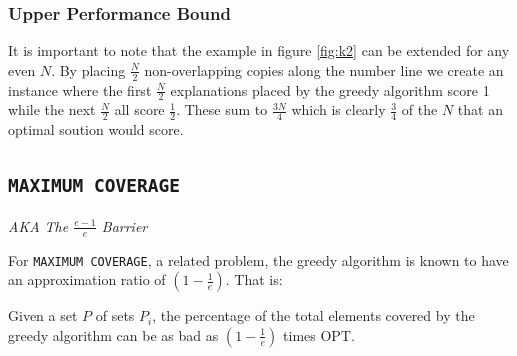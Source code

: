 \subsubsection{Upper Performance Bound}

It is important to note that the example in figure \ref{fig:k2} can be extended for any even $N$. By placing $\frac{N}{2}$ non-overlapping copies along the number line we create an instance where the first $\frac{N}{2}$ explanations placed by the greedy algorithm score 1 while the next $\frac{N}{2}$ all score $\frac12$.  These sum to $\frac{3N}{4}$ which is clearly $\frac{3}{4}$ of the $N$ that an optimal soution would score.

\subsection{\texttt{MAXIMUM COVERAGE}}

\textit{AKA The $\frac{e-1}{e}$ Barrier}

For \texttt{MAXIMUM COVERAGE}, a related problem, the greedy algorithm is known to have an approximation ratio of  $(1-\frac{1}{e})$.  That is: 

\begin{thm} Given a set $P$ of sets $P_i$, the percentage of the total elements covered by the greedy algorithm can be as bad as $(1-\frac{1}{e})$ times OPT.
\end{thm}

